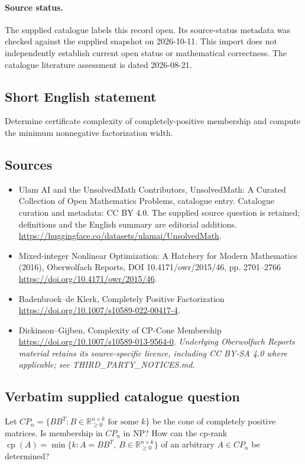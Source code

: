 \documentclass[11pt]{article}
\begin{document}
\paragraph{Source status.}
The supplied catalogue labels this record open. Its source-status metadata was checked against the supplied snapshot on 2026-10-11. This import does not independently establish current open status or mathematical correctness. The catalogue literature assessment is dated 2026-08-21.
\subsection{Short English statement}
Determine certificate complexity of completely-positive membership and compute the minimum nonnegative factorization width.
\subsection{Sources}
\begin{itemize}
\item[S1] Ulam AI and the UnsolvedMath Contributors, UnsolvedMath: A Curated Collection of Open Mathematics Problems, catalogue entry. Catalogue curation and metadata: CC BY 4.0. The supplied source question is retained; definitions and the English summary are editorial additions.
\url{https://huggingface.co/datasets/ulamai/UnsolvedMath}.
\item[S2] Mixed-integer Nonlinear Optimization: A Hatchery for Modern Mathematics (2016), Oberwolfach Reports, DOI 10.4171/owr/2015/46, pp. 2701--2766
\url{https://doi.org/10.4171/owr/2015/46}.
\item[S3] Badenbroek--de Klerk, Completely Positive Factorization
\url{https://doi.org/10.1007/s10589-022-00417-4}.
\item[S4] Dickinson--Gijben, Complexity of CP-Cone Membership
\url{https://doi.org/10.1007/s10589-013-9564-0}.
\textit{Underlying Oberwolfach Reports material retains its source-specific licence, including CC BY-SA 4.0 where applicable; see THIRD\_PARTY\_NOTICES.md.}
\end{itemize}
\subsection{Verbatim supplied catalogue question}
Let $CP_n=\{BB^T:B\in\mathbb R_{\geq0}^{n\times k}\text{ for some }k\}$ be the cone of completely positive matrices. Is membership in $CP_n$ in NP? How can the cp-rank $\operatorname{cp}(A)=\min\{k:A=BB^T,\ B\in\mathbb R_{\geq0}^{n\times k}\}$ of an arbitrary $A\in CP_n$ be determined?
\end{document}
